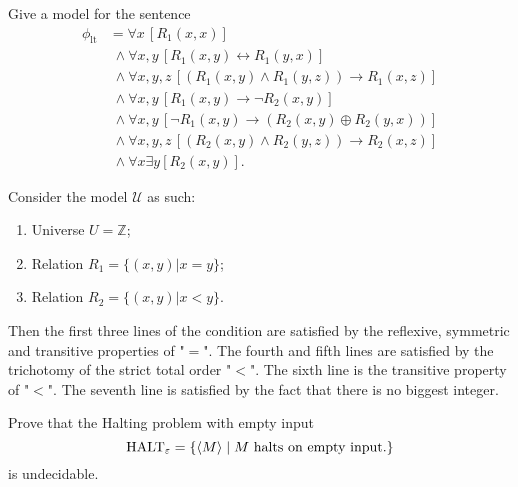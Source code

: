 \documentclass{homework}
\begin{document}
\begin{problem}
  Give a model for the sentence
  \begin{equation*}
    \begin{split}
      \phi_{\mathrm{lt}}
      & = \forall x\, [R_{1}(x, x)]\\
      & \; \land \forall x,y\, [R_{1}(x,y) \leftrightarrow R_{1}(y,x)]\\
      & \; \land \forall x,y,z\, [(R_{1}(x,y) \land R_{1}(y,z))
        \rightarrow R_{1}(x,z)]\\
      & \; \land \forall x,y\, [R_{1}(x,y) \rightarrow \neg R_{2}(x,y)]\\
      & \; \land \forall x,y\, [\neg R_{1}(x,y) \rightarrow (R_{2}(x,y)
        \oplus R_{2}(y,x))]\\
      & \; \land \forall x,y,z\, [(R_{2}(x,y) \land R_{2}(y,z))
        \rightarrow R_{2}(x,z)]\\
      & \; \land \forall x \exists y [ R_{2}(x,y) ].
    \end{split}
  \end{equation*}

\end{problem}

\begin{solution}
  Consider the model $\mathcal{U}$ as such:
  \begin{enumerate}
    \item Universe $U = \mathbb{Z}$;
    \item Relation $R_1 = \{(x,y)|x=y\}$;
    \item Relation $R_2 = \{(x,y)|x<y\}$.
  \end{enumerate}

  Then the first three lines of the condition are satisfied by the reflexive, symmetric and transitive properties of "$=$". The fourth and fifth lines are satisfied by the trichotomy of the strict total order "$<$". The sixth line is the transitive property of "$<$". The seventh line is satisfied by the fact that there is no biggest integer. 
\end{solution}

\begin{problem}
  Prove that the Halting problem with empty input
  \begin{equation*}
    \mathrm{HALT}_{\varepsilon} = \{ \langle M \rangle \mid M
    \text{ halts on empty input.}\}
  \end{equation*}
  is undecidable.
\end{problem}
\end{document}
